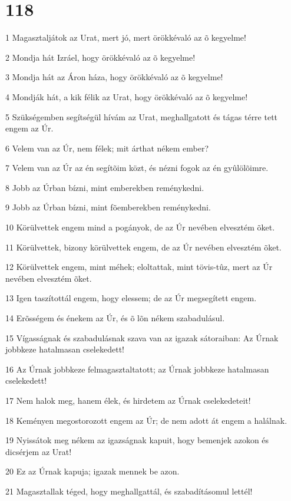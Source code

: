 \chapter{118}

\par 1 Magasztaljátok az Urat, mert jó, mert örökkévaló az õ kegyelme!
\par 2 Mondja hát Izráel, hogy örökkévaló az õ kegyelme!
\par 3 Mondja hát az Áron háza, hogy örökkévaló az õ kegyelme!
\par 4 Mondják hát, a kik félik az Urat, hogy örökkévaló az õ kegyelme!
\par 5 Szükségemben segítségül hívám az Urat, meghallgatott és tágas térre tett engem az Úr.
\par 6 Velem van az Úr, nem félek; mit árthat nékem ember?
\par 7 Velem van az Úr az én segítõim közt, és nézni fogok az én gyûlölõimre.
\par 8 Jobb az Úrban bízni, mint emberekben reménykedni.
\par 9 Jobb az Úrban bízni, mint fõemberekben reménykedni.
\par 10 Körülvettek engem mind a pogányok, de az Úr nevében elvesztém õket.
\par 11 Körülvettek, bizony körülvettek engem, de az Úr nevében elvesztém õket.
\par 12 Körülvettek engem, mint méhek; eloltattak, mint tövis-tûz, mert az Úr nevében elvesztém õket.
\par 13 Igen taszítottál engem, hogy elessem; de az Úr megsegített engem.
\par 14 Erõsségem és énekem az Úr, és õ lõn nékem szabadulásul.
\par 15 Vígasságnak és szabadulásnak szava van az igazak sátoraiban: Az Úrnak jobbkeze hatalmasan cselekedett!
\par 16 Az Úrnak jobbkeze felmagasztaltatott; az Úrnak jobbkeze hatalmasan cselekedett!
\par 17 Nem halok meg, hanem élek, és hirdetem az Úrnak cselekedeteit!
\par 18 Keményen megostorozott engem az Úr; de nem adott át engem a halálnak.
\par 19 Nyissátok meg nékem az igazságnak kapuit, hogy bemenjek azokon és dicsérjem az Urat!
\par 20 Ez az Úrnak kapuja; igazak mennek be azon.
\par 21 Magasztallak téged, hogy meghallgattál, és szabadításomul lettél!
